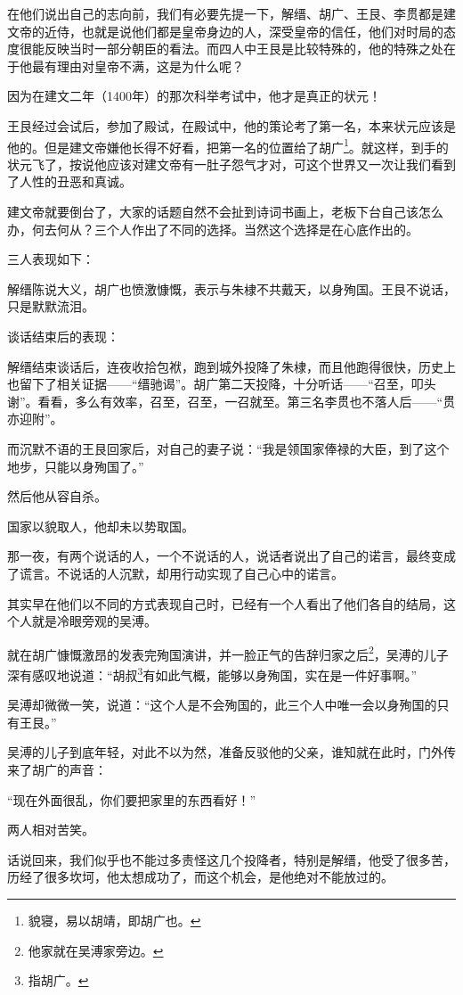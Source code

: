 \begin{multicols}{\theparacolNo}
在他们说出自己的志向前，我们有必要先提一下，解缙、胡广、王艮、李贯都是建文帝的近侍，也就是说他们都是皇帝身边的人，深受皇帝的信任，他们对时局的态度很能反映当时一部分朝臣的看法。而四人中王艮是比较特殊的，他的特殊之处在于他最有理由对皇帝不满，这是为什么呢？

因为在建文二年（1400年）的那次科举考试中，他才是真正的状元！

王艮经过会试后，参加了殿试，在殿试中，他的策论考了第一名，本来状元应该是他的。但是建文帝嫌他长得不好看，把第一名的位置给了胡广\footnote{貌寝，易以胡靖，即胡广也。}。就这样，到手的状元飞了，按说他应该对建文帝有一肚子怨气才对，可这个世界又一次让我们看到了人性的丑恶和真诚。

建文帝就要倒台了，大家的话题自然不会扯到诗词书画上，老板下台自己该怎么办，何去何从？三个人作出了不同的选择。当然这个选择是在心底作出的。

三人表现如下：

解缙陈说大义，胡广也愤激慷慨，表示与朱棣不共戴天，以身殉国。王艮不说话，只是默默流泪。

谈话结束后的表现：

解缙结束谈话后，连夜收拾包袱，跑到城外投降了朱棣，而且他跑得很快，历史上也留下了相关证据——“缙驰谒”。胡广第二天投降，十分听话——“召至，叩头谢”。看看，多么有效率，召至，召至，一召就至。第三名李贯也不落人后——“贯亦迎附”。

而沉默不语的王艮回家后，对自己的妻子说：“我是领国家俸禄的大臣，到了这个地步，只能以身殉国了。”

然后他从容自杀。

国家以貌取人，他却未以势取国。

那一夜，有两个说话的人，一个不说话的人，说话者说出了自己的诺言，最终变成了谎言。不说话的人沉默，却用行动实现了自己心中的诺言。

其实早在他们以不同的方式表现自己时，已经有一个人看出了他们各自的结局，这个人就是冷眼旁观的吴溥。

就在胡广慷慨激昂的发表完殉国演讲，并一脸正气的告辞归家之后\footnote{他家就在吴溥家旁边。}，吴溥的儿子深有感叹地说道：“胡叔\footnote{指胡广。}有如此气概，能够以身殉国，实在是一件好事啊。”

吴溥却微微一笑，说道：“这个人是不会殉国的，此三个人中唯一会以身殉国的只有王艮。”

吴溥的儿子到底年轻，对此不以为然，准备反驳他的父亲，谁知就在此时，门外传来了胡广的声音：

“现在外面很乱，你们要把家里的东西看好！”

两人相对苦笑。

话说回来，我们似乎也不能过多责怪这几个投降者，特别是解缙，他受了很多苦，历经了很多坎坷，他太想成功了，而这个机会，是他绝对不能放过的。


\end{multicols}
